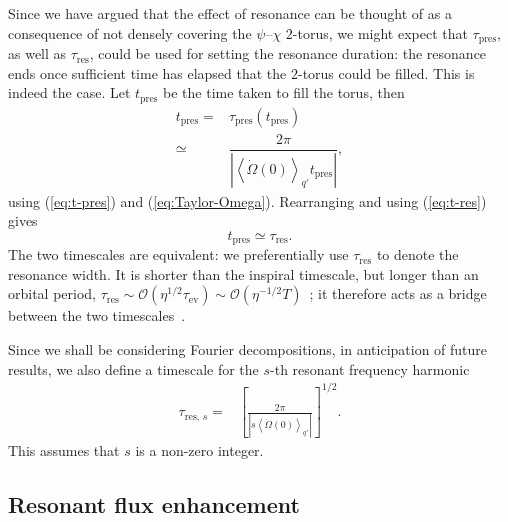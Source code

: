 \documentclass[aps,prd,amsfonts,amssymb,amsmath,nofootinbib,showpacs,superscriptaddress,twocolumn]{revtex4}
\newcommand{\eqnref}[1]{(\ref{eq:#1})}
\newcommand{\sub}[1]{\ensuremath{_\mathrm{#1}}}
\newcommand{\order}[1]{\ensuremath{\mathcal{O}({#1})}}
\begin{document}
Since we have argued that the effect of resonance can be thought of as a consequence of not densely covering the $\psi$--$\chi$ $2$-torus, we might expect that $\tau\sub{pres}$, as well as $\tau\sub{res}$, could be used for setting the resonance duration: the resonance ends once sufficient time has elapsed that the $2$-torus could be filled. This is indeed the case. Let $t\sub{pres}$ be the time taken to fill the torus, then
\begin{align}
t\sub{pres} = {} & \tau\sub{pres}(t\sub{pres}) \\
 \simeq {} & \dfrac{2\pi}{\left|\left\langle\dot{\Omega}(0)\right\rangle_{q'} t\sub{pres}\right|}, \nonumber 
\end{align}
using \eqnref{t-pres} and \eqnref{Taylor-Omega}. Rearranging and using \eqnref{t-res} gives
\begin{equation}
t\sub{pres} \simeq \tau\sub{res}.
\end{equation}
The two timescales are equivalent: we preferentially use $\tau\sub{res}$ to denote the resonance width. It is shorter than the inspiral timescale, but longer than an orbital period, $\tau\sub{res} \sim \order{\eta^{1/2}\tau\sub{ev}} \sim \order{\eta^{-1/2}T}$~\cite{Flanagan2012,Gair2011a}; it therefore acts as a bridge between the two timescales~\cite{Hinderer2008}.

Since we shall be considering Fourier decompositions, in anticipation of future results, we also define a timescale for the $s$-th resonant frequency harmonic
\begin{align}
\tau_{\mathrm{res},\,s} = {} & \left[\frac{2\pi}{\left|s\left\langle \dot{\Omega}(0)\right\rangle_{q'}\right|}\right]^{1/2}.
\label{eq:T-res-s}
\end{align}
This assumes that $s$ is a non-zero integer.

\subsection{Resonant flux enhancement}
\label{sec:flux-enhance}
\end{document}
